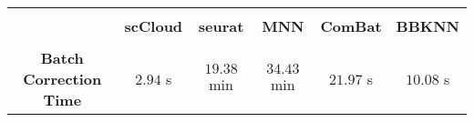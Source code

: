 \documentclass{article}
\begin{document}
\begin{tabular}{|c|c|c|c|c|c|}\hline
& & & & & \\[-10pt]
 & \textbf{scCloud} & \textbf{seurat} & \textbf{MNN} & \textbf{ComBat} & \textbf{BBKNN }\\[2pt]\hline
 & & & & & \\[-10pt]
 \textbf{Batch Correction Time} & $2.94$ s & $19.38$ min & $34.43$ min & $21.97$ s & $10.08$ s  \\[2pt]\hline
\end{tabular}
\end{document}
